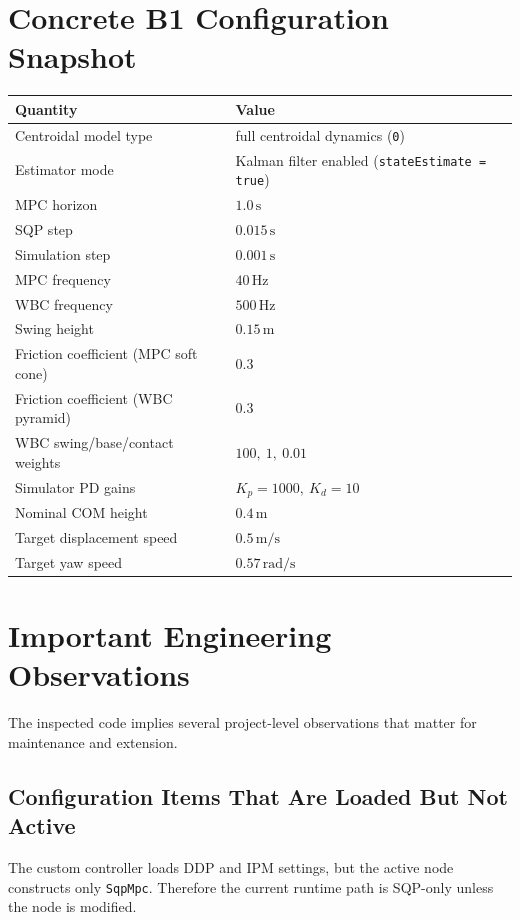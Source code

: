\documentclass[11pt,a4paper]{article}
\newcommand{\code}[1]{\texttt{#1}}
\begin{document}
\section{Concrete B1 Configuration Snapshot}
\begin{table}[ht]
\centering
\small
\begin{tabularx}{\textwidth}{>{\raggedright\arraybackslash}X >{\raggedright\arraybackslash}X}
\toprule
Quantity & Value \\
\midrule
Centroidal model type & full centroidal dynamics (\code{0}) \\
Estimator mode & Kalman filter enabled (\code{stateEstimate = true}) \\
MPC horizon & \(1.0\,\mathrm{s}\) \\
SQP step & \(0.015\,\mathrm{s}\) \\
Simulation step & \(0.001\,\mathrm{s}\) \\
MPC frequency & \(40\,\mathrm{Hz}\) \\
WBC frequency & \(500\,\mathrm{Hz}\) \\
Swing height & \(0.15\,\mathrm{m}\) \\
Friction coefficient (MPC soft cone) & \(0.3\) \\
Friction coefficient (WBC pyramid) & \(0.3\) \\
WBC swing/base/contact weights & \(100,\ 1,\ 0.01\) \\
Simulator PD gains & \(K_p=1000,\ K_d=10\) \\
Nominal COM height & \(0.4\,\mathrm{m}\) \\
Target displacement speed & \(0.5\,\mathrm{m/s}\) \\
Target yaw speed & \(0.57\,\mathrm{rad/s}\) \\
\bottomrule
\end{tabularx}
\end{table}

\section{Important Engineering Observations}
The inspected code implies several project-level observations that matter for maintenance and extension.

\subsection{Configuration Items That Are Loaded But Not Active}
The custom controller loads DDP and IPM settings, but the active node constructs only \code{SqpMpc}. Therefore the current runtime path is SQP-only unless the node is modified.
\end{document}
